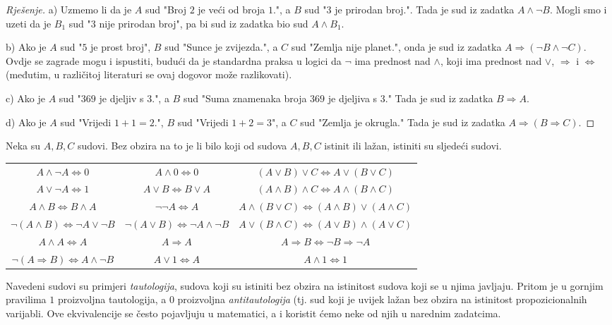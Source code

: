 \begin{proof}[Rješenje]
a) Uzmemo li da je \(A\) sud "Broj \(2\) je veći od broja \(1\).", a \(B\) sud "\(3\) je prirodan broj.". Tada je sud iz zadatka \(A\wedge \neg B\). Mogli smo i uzeti da je \(B_1\) sud "\(3\) nije prirodan broj", pa bi sud iz zadatka bio sud \(A\wedge B_1\).

b) Ako je \(A\) sud "\(5\) je prost broj", \(B\) sud "Sunce je zvijezda.", a \(C\) sud "Zemlja nije planet.", onda je sud iz zadatka \(A\Rightarrow (\neg B\wedge \neg C)\). Ovdje se zagrade mogu i ispustiti, budući da je standardna praksa u logici da \(\neg\) ima prednost nad \(\wedge\), koji ima prednost nad \(\vee\), \(\Rightarrow\) i \(\Leftrightarrow\) (međutim, u različitoj literaturi se ovaj dogovor može razlikovati).

c) Ako je \(A\) sud "\(369\) je djeljiv s \(3\).", a \(B\) sud "Suma znamenaka broja \(369\) je djeljiva s \(3\)." Tada je sud iz zadatka \(B\Rightarrow A\).

d) Ako je \(A\) sud "Vrijedi \(1+1=2\).", \(B\) sud "Vrijedi \(1+2=3\)", a \(C\) sud "Zemlja je okrugla." Tada je sud iz zadatka \(A\Rightarrow(B\Rightarrow C)\).
\end{proof}
\begin{remark}
\label{taut}
Neka su \(A, B, C\) sudovi. Bez obzira na to je li bilo koji od sudova \(A, B, C\) istinit ili lažan, istiniti su sljedeći sudovi.
\begin{center}
\begin{tabular}{c c c}
\label{tabl}
\(A\wedge \neg A \Leftrightarrow 0\) & \(A\wedge 0\Leftrightarrow 0\) & \((A\vee B)\vee C\Leftrightarrow A\vee (B\vee C)\)\\
\(A\vee \neg A \Leftrightarrow 1\) & \(A\vee B\Leftrightarrow B\vee A\) & \((A\wedge B)\wedge C\Leftrightarrow A\wedge (B\wedge C)\)\\
\(A\wedge B \Leftrightarrow B\wedge A\) & \(\neg \neg A\Leftrightarrow A\) & \(A\wedge(B\vee C)\Leftrightarrow (A\wedge B)\vee (A\wedge C)\)\\
\(\neg(A\wedge B)\Leftrightarrow \neg A \vee \neg B\) & \(\neg (A\vee B)\Leftrightarrow \neg A\wedge \neg B\) & \(A\vee (B\wedge C)\Leftrightarrow (A\vee B)\wedge (A\vee C)\)\\
\(A\wedge A\Leftrightarrow A\) & \(A\Rightarrow A\) & \(A\Rightarrow B \Leftrightarrow \neg B\Rightarrow \neg A\)\\
\(\neg (A\Rightarrow B)\Leftrightarrow A\wedge \neg B\) & \(A\vee 1\Leftrightarrow A\) & \(A\wedge 1\Leftrightarrow 1\)
\end{tabular}
\end{center}
Navedeni sudovi su primjeri \textit{tautologija}, sudova koji su istiniti bez obzira na istinitost sudova koji se u njima javljaju. Pritom je u gornjim pravilima \(1\) proizvoljna tautologija, a \(0\) proizvoljna \textit{antitautologija} (tj. sud koji je uvijek lažan bez obzira na istinitost propozicionalnih varijabli. Ove ekvivalencije se često pojavljuju u matematici, a i koristit ćemo neke od njih u narednim zadatcima.
\end{remark}
